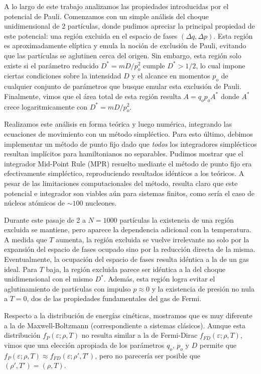 A lo largo de este trabajo analizamos las propiedades introducidas por el potencial de Pauli.
Comenzamos con un simple análisis del choque unidimensional de 2 partículas, donde pudimos apreciar la principal propiedad de este potencial: una región excluida en el espacio de fases $(\Delta q, \Delta p)$.
Esta región es aproximadamente elíptica y emula la noción de exclusión de Pauli, evitando que las partículas se aglutinen cerca del origen.
Sin embargo, esta región solo existe si el parámetro reducido $D^*=mD/p_o^2$ cumple $D^*>1/2$, lo cual impone ciertas condiciones sobre la intensidad $D$ y el alcance en momentos $p_o$ de cualquier conjunto de 
parámetros que busque emular esta exclusión de Pauli.
Finalmente, vimos que el área total de esta región resulta $A=q_op_oA^*$ donde $A^*$ crece logaritmicamente con $D^*=mD/p_o^2$.

Realizamos este análisis en forma teórica y luego numérica, integrando las ecuaciones de movimiento con un método simpléctico.
Para esto último, debimos implementar un método de punto fijo dado que \textit{todos} los integradores simplécticos resultan implícitos para hamiltonianos no separables.
Pudimos mostrar que el integrador Mid-Point Rule (MPR) resuelto mediante el método de punto fijo era efectivamente simpléctico, reproduciendo resultados idénticos a los teóricos.
A pesar de las limitaciones computacionales del método, resulta claro que este potencial e integrador son viables aún para sistemas finitos, como sería el caso de núcleos atómicos de $\sim 100$ nucleones.

Durante este pasaje de 2 a $N=1000$ partículas la existencia de una región excluida se mantiene, pero aparece la dependencia adicional con la temperatura.
A medida que $T$ aumenta, la región excluida se vuelve irrelevante no solo por la expansión del espacio de fases ocupado sino por la reducción directa de la misma. 
Eventualmente, la ocupación del espacio de fases resulta idéntica a la de un gas ideal.
Para $T$ baja, la región excluida parece ser idéntica a la del choque unidimensional con el mismo $D^*$.
Además, esta región logra evitar el aglutinamiento de partículas con impulso $p\approx0$ y la existencia de presión no nula a $T=0$, dos de las propiedades fundamentales del gas de Fermi.

Respecto a la distribución de energías cinéticas, mostramos que es muy diferente a la de Maxwell-Boltzmann (correspondiente a sistemas clásicos).
Aunque esta distribución $f_P(\varepsilon;\rho,T)$ no resulta similar a la de Fermi-Dirac $f_{FD}(\varepsilon;\rho,T)$, vimos que una elección apropiada de los parámetros $q_o$, $p_o$ y $D$ 
permite que $f_P(\varepsilon;\rho,T)\approx f_{FD}(\varepsilon;\rho',T')$, pero no parecería ser posible que $(\rho',T') = (\rho, T)$.

